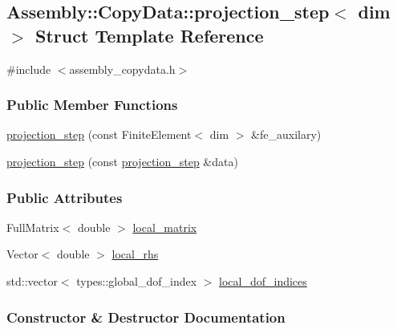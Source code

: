 \hypertarget{struct_assembly_1_1_copy_data_1_1projection__step}{}\subsection{Assembly\+:\+:Copy\+Data\+:\+:projection\+\_\+step$<$ dim $>$ Struct Template Reference}
\label{struct_assembly_1_1_copy_data_1_1projection__step}


{\ttfamily \#include $<$assembly\+\_\+copydata.\+h$>$}

\subsubsection*{Public Member Functions}
\begin{DoxyCompactItemize}
\item 
\hyperlink{struct_assembly_1_1_copy_data_1_1projection__step_ae9dbb67f437af3436e16fa0f1b4939a4}{projection\+\_\+step} (const Finite\+Element$<$ dim $>$ \&fe\+\_\+auxilary)
\item 
\hyperlink{struct_assembly_1_1_copy_data_1_1projection__step_a3ee7e60d299b6a599cb7a3e87258ed69}{projection\+\_\+step} (const \hyperlink{struct_assembly_1_1_copy_data_1_1projection__step}{projection\+\_\+step} \&data)
\end{DoxyCompactItemize}
\subsubsection*{Public Attributes}
\begin{DoxyCompactItemize}
\item 
Full\+Matrix$<$ double $>$ \hyperlink{struct_assembly_1_1_copy_data_1_1projection__step_afd29a90013688a947f0100bd4541e1d1}{local\+\_\+matrix}
\item 
Vector$<$ double $>$ \hyperlink{struct_assembly_1_1_copy_data_1_1projection__step_afe718ce6054f5dc781f60bdc2b1bdc82}{local\+\_\+rhs}
\item 
std\+::vector$<$ types\+::global\+\_\+dof\+\_\+index $>$ \hyperlink{struct_assembly_1_1_copy_data_1_1projection__step_a96eade218526cf002d141d536572b75d}{local\+\_\+dof\+\_\+indices}
\end{DoxyCompactItemize}


\subsubsection{Constructor \& Destructor Documentation}
\hypertarget{struct_assembly_1_1_copy_data_1_1projection__step_ae9dbb67f437af3436e16fa0f1b4939a4}{}
